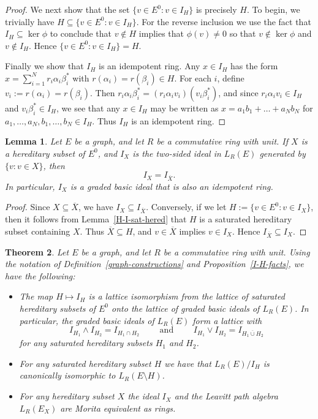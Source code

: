 \documentclass[11pt]{amsart}
\newtheorem{theorem}{Theorem}[section]
\newtheorem{lemma}[theorem]{Lemma}
\theoremstyle{remark}
\numberwithin{equation}{section}
\begin{document}
\begin{proof}
We next show that the set $\{ v \in E^0 : v \in I_H \}$ is precisely $H$.  To begin, we trivially have $H \subseteq \{ v \in E^0 : v \in I_H \}$.  For the reverse inclusion we use the fact that $I_H \subseteq \ker \phi$ to conclude that $v \notin H$ implies that $\phi(v) \neq 0$ so that $v \notin \ker \phi$ and $v \notin I_H$.  Hence $\{ v \in E^0 : v \in I_H \} = H$.




Finally we show that $I_H$ is an idempotent ring.  Any $x \in I_H$ has the form $x = \sum_{i=1}^N r_i \alpha_i \beta_i^*$ with $r(\alpha_i) = r(\beta_i) \in H$.  For each $i$, define $v_i := r(\alpha_i) = r(\beta_i)$.  Then $r_i\alpha_i \beta_i^* = (r_i \alpha_i v_i) (v_i \beta_i^*)$, and since $r_i \alpha_i v_i \in I_H$ and $v_i \beta_i^* \in I_H$, we see that any $x \in I_H$ may be written as $x = a_1b_1 + \ldots + a_Nb_N$ for $a_1, \ldots, a_N, b_1, \ldots, b_N \in I_H$.  Thus $I_H$ is an idempotent ring.
\end{proof}

\begin{lemma} \label{hered-sat-ideal}
Let $E$ be a graph, and let $R$ be a commutative ring with unit.  If $X$ is a hereditary subset of $E^0$, and $I_X$ is the two-sided ideal in $L_R(E)$ generated by $\{ v : v \in X \}$, then $$I_X = I_{\overline{X}}.$$  In particular, $I_X$ is a graded basic ideal that is also an idempotent ring.  
\end{lemma}

\begin{proof}
Since $X \subseteq \overline{X}$, we have $I_X \subseteq I_{\overline{X}}$.  Conversely, if we let $H := \{ v \in E^0 : v \in I_X \}$, then it follows from Lemma~\ref{H-I-sat-hered} that $H$ is a saturated hereditary subset containing $X$.  Thus $\overline{X} \subseteq H$, and $v \in \overline{X}$ implies $v \in I_X$.  Hence $I_{\overline{X}} \subseteq I_X$.
\end{proof}

\begin{theorem} \label{graded-ideals-structure}
Let $E$ be a graph, and let $R$ be a commutative ring with unit. Using the notation of Definition~\ref{graph-constructions} and Proposition~\ref{I-H-facts}, we have the following:
\begin{itemize}
\item[(1)]  The map $H \mapsto I_H$ is a lattice isomorphism from the lattice of saturated hereditary subsets of $E^0$ onto the lattice of graded basic ideals of $L_R(E)$.  In particular, the graded basic ideals of $L_R(E)$ form a lattice with $$I_{H_1} \wedge I_{H_2} = I_{H_1 \cap H_2} \qquad \text{ and } \qquad I_{H_1} \vee I_{H_2} = I_{\overline{H_1 \cup H_2}}$$ for any saturated hereditary subsets $H_1$ and $H_2$.
\item[(2)] For any saturated hereditary subset $H$ we have that $L_R(E) / I_H$ is canonically isomorphic to $L_R(E\setminus H)$.
\item[(3)]  For any hereditary subset $X$ the ideal $I_X$ and the Leavitt path algebra $L_R (E_X)$ are Morita equivalent as rings.
\end{itemize}
\end{theorem}
\end{document}
